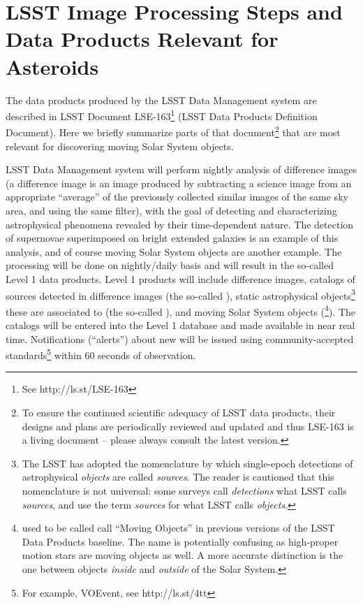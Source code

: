 \section{LSST Image Processing Steps and Data Products Relevant for Asteroids} \label{sec:AppA}

The data products produced by the LSST Data Management system are described in 
LSST Document LSE-163\footnote{See http://ls.st/LSE-163} (LSST Data Products
Definition Document). Here we briefly summarize parts of that
document\footnote{To ensure the continued scientific adequacy of LSST data 
products, their designs and plans are periodically reviewed and updated and
thus LSE-163 is a living document -- please always consult the latest version.}
that are most relevant for discovering moving Solar System objects. 

LSST Data Management system will perform nightly analysis of difference images (a difference
image is an image produced by subtracting a science image from an appropriate 
``average'' of the previously collected similar images of the same sky area, and using the 
same filter), with the goal of detecting and characterizing astrophysical phenomena 
revealed by their time-dependent nature. The detection of supernovae superimposed 
on bright extended galaxies is an example of this analysis, and of course moving Solar
System objects are another example. The processing will be done on nightly/daily 
basis and will result in the so-called Level 1 data products. Level 1 products will include 
difference images, catalogs of sources detected in difference images (the so-called
\DIASources), static astrophysical objects\footnote{The LSST has adopted the nomenclature by 
which single-epoch detections of astrophysical {\em objects} are called {\em sources}. 
The reader is cautioned that this nomenclature is not universal: some surveys call 
{\em detections} what LSST calls {\em sources}, and use the term {\em sources} for what 
LSST calls {\em objects}.} these \DIASources are associated to (the so-called \DIAObjects), 
and moving Solar System objects (\SSObjects\footnote{\SSObjects used to be called call 
``Moving Objects'' in previous versions of the LSST Data Products baseline. The name is 
potentially confusing as high-proper motion stars are moving objects as well. A more 
accurate distinction is the one between objects {\em inside} and {\em outside} of the Solar 
System.}). The catalogs will be entered into the Level 1 database and made available in near 
real time. Notifications (``alerts'') about new \DIASources will be issued using 
community-accepted standards\footnote{For example, VOEvent, see http://ls.st/4tt} within 
60 seconds of observation. 

